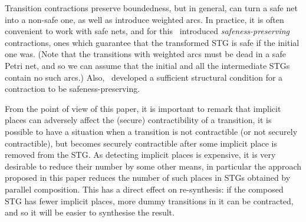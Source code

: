Transition contractions preserve boundedness, but in general,
can turn a safe net into a non-safe one, as well as
introduce weighted arcs. In practice, it is often convenient to work with safe nets, and for this~\cite{KSVW-09} introduced \emph{safeness-preserving} contractions, \ie ones which
guarantee that  the transformed STG is safe if the initial one
was. (Note that the transitions with weighted arcs must be dead
in a safe Petri net, and so we can assume that the initial and
all the intermediate STGs contain no such arcs.) Also,~\cite{KSVW-09} developed a sufficient structural
condition for a contraction to be safe\-ness-pre\-ser\-ving.

From the point of view of this paper, it is important to remark that implicit places can adversely affect the (secure) contractibility of a transition, \ie it is possible to have a situation when a transition is not contractible (or not securely contractible), but becomes securely contractible after some implicit place is removed from the STG. As detecting implicit places is expensive, it is very desirable to reduce their number by some other means, in particular the approach proposed in this paper reduces the number of such places in STGs obtained by parallel composition. This has a direct effect on re-synthesis: if the composed STG has fewer implicit places, more dummy transitions in it can be contracted, and so it will be easier to synthesise the result.
